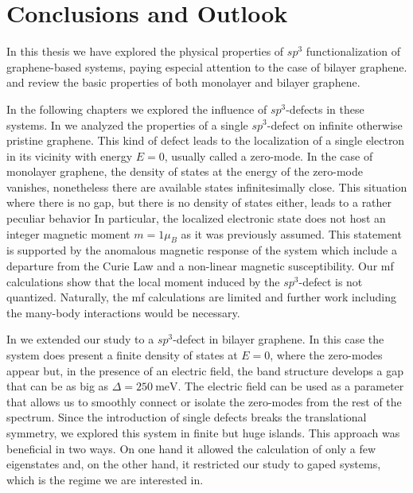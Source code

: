 \chapter{Conclusions and Outlook}
\label{conclusions}
In this thesis we have explored the physical properties of $sp^3$ functionalization of graphene-based systems, paying especial attention to the case of bilayer graphene.  and  review the basic properties of both monolayer and bilayer graphene.

In the following chapters we explored the influence of $sp^3$-defects in these systems. In  we analyzed the properties of a single $sp^3$-defect on infinite otherwise pristine graphene. This kind of defect leads to the localization of a single electron in its vicinity with energy $E=0$, usually called a zero-mode. In the case of monolayer graphene, the density of states at the energy of the zero-mode vanishes, nonetheless there are available states infinitesimally close. This situation where there is no gap, but there is no density of states either, leads to a rather peculiar behavior
In particular, the localized electronic state does not host an integer magnetic moment $m=1\mu_B$ as it was previously assumed. This statement is supported by the anomalous magnetic response of the system which include a departure from the Curie Law and a non-linear magnetic susceptibility. Our \ac{mf} calculations show that the local moment induced by the $sp^3$-defect is not quantized. Naturally, the \ac{mf} calculations are limited and further work including the many-body interactions would be necessary.
\medskip


In  we extended our study to a $sp^3$-defect in bilayer graphene. In this case the system does present a finite density of states at $E=0$, where the zero-modes appear but, in the presence of an electric field, the band structure develops a gap that can be as big as $\Delta=\SI{250}{\meV}$.
The electric field can be used as a parameter that allows us to smoothly connect or isolate the zero-modes from the rest of the spectrum.
Since the introduction of single defects breaks the translational symmetry, we explored this system in finite but huge islands. This approach was beneficial in two ways. On one hand it allowed the calculation of only a few eigenstates and, on the other hand, it restricted our study to gaped systems, which is the regime we are interested in.

